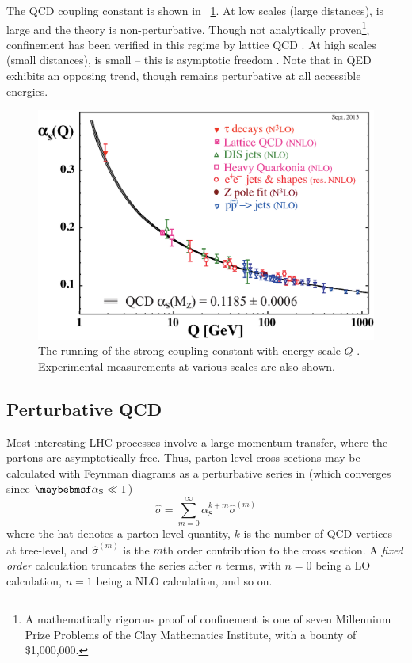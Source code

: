 The \ac{QCD} coupling constant \alphaS is shown in \Figure~\ref{fig:qcd:alpha_s}. At low 
scales (large distances), \alphaS is large and the theory is non-perturbative. 
Though not analytically proven\footnote{
	A mathematically rigorous proof of confinement is one of seven Millennium Prize 
	Problems of the Clay Mathematics Institute, with a bounty of \$1,000,000.
}, confinement has been verified in this regime by lattice \ac{QCD} \cite{Wilson:1974}. 
At high scales (small distances), \alphaS is small -- this is asymptotic freedom 
\cite{Gross:1973,Politzer:1973}. Note that \alphaEM in \acs{QED} exhibits an opposing 
trend, though remains perturbative at all accessible energies.
\begin{figure}
	\includegraphics[width=\mediumfigwidth]{tex/tools/alpha_s}
	\caption{The running of the strong coupling constant \alphaS with energy scale $Q$ 
	\cite{PDG:2012}. Experimental measurements at various scales are also shown.}
	\label{fig:qcd:alpha_s}
\end{figure}



\subsection{Perturbative QCD}
\label{sec:qcd:pqcd}

Most interesting \acs{LHC} processes involve a large momentum transfer, where the partons 
are asymptotically free. Thus, parton-level cross sections may be calculated with Feynman 
diagrams as a perturbative series in \alphaS (which converges since $\alphaS \ll 1$)
\begin{equation}
	\hat{\sigma} = \sum\limits_{m=0}^{\infty} \alpha_{\text{S}}^{k+m} \hat{\sigma}^{(m)}
	\label{eq:qcd:partonic_xs}
\end{equation}
where the hat denotes a parton-level quantity, $k$ is the number of \ac{QCD} vertices at 
tree-level, and $\hat{\sigma}^{(m)}$ is the $m$th order contribution to the cross section.
A \textit{fixed order} calculation truncates the series after $n$ terms, with $n=0$ being 
a \ac{LO} calculation, $n=1$ being a \ac{NLO} calculation, and so on.

